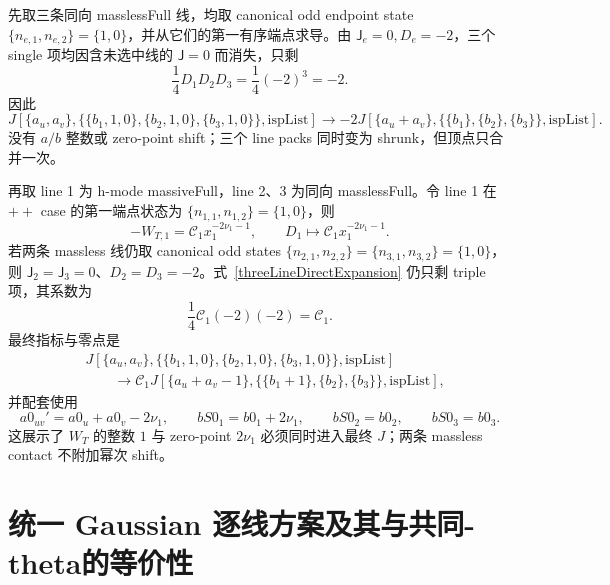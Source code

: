 ﻿\documentclass[a4paper,11pt]{article}
\begin{document}
先取三条同向 masslessFull 线，均取 canonical odd endpoint state $\{n_{e,1},n_{e,2}\}=\{1,0\}$，并从它们的第一有序端点求导。由 $\mathsf J_e=0,D_e=-2$，三个 single 项均因含未选中线的 $\mathsf J=0$ 而消失，只剩
\begin{equation}
 \frac14D_1D_2D_3=\frac14(-2)^3=-2.
\end{equation}
因此
\begin{equation}
 J\!\left[\{a_u,a_v\},
   \{\{b_1,1,0\},\{b_2,1,0\},\{b_3,1,0\}\},\mathrm{ispList}\right]
 \longrightarrow
 -2J\!\left[\{a_u+a_v\},
   \{\{b_1\},\{b_2\},\{b_3\}\},\mathrm{ispList}\right].
 \label{threeMasslessIndexExample}
\end{equation}
没有 $a/b$ 整数或 zero-point shift；三个 line packs 同时变为 shrunk，但顶点只合并一次。

再取 line 1 为 h-mode massiveFull，line 2、3 为同向 masslessFull。令 line 1 在 $++$ case 的第一端点状态为 $\{n_{1,1},n_{1,2}\}=\{1,0\}$，则
\begin{equation}
 -W_{T,1}=\mathcal C_1x_1^{-2\nu_1-1},
 \qquad D_1\longmapsto\mathcal C_1x_1^{-2\nu_1-1}.
\end{equation}
若两条 massless 线仍取 canonical odd states $\{n_{2,1},n_{2,2}\}=\{n_{3,1},n_{3,2}\}=\{1,0\}$，则 $\mathsf J_2=\mathsf J_3=0$、$D_2=D_3=-2$。式~\eqref{threeLineDirectExpansion} 仍只剩 triple 项，其系数为
\begin{equation}
 \frac14\mathcal C_1(-2)(-2)=\mathcal C_1.
\end{equation}
最终指标与零点是
\begin{align}
 &J\!\left[\{a_u,a_v\},
  \{\{b_1,1,0\},\{b_2,1,0\},\{b_3,1,0\}\},\mathrm{ispList}\right]
 \nonumber\\
 &\qquad\longrightarrow
 \mathcal C_1
 J\!\left[\{a_u+a_v-1\},
  \{\{b_1+1\},\{b_2\},\{b_3\}\},\mathrm{ispList}\right],
 \label{mixedThreeLineIndexExample}
\end{align}
并配套使用
\begin{equation}
 a0_{uv}'=a0_u+a0_v-2\nu_1,
 \qquad bS0_1=b0_1+2\nu_1,
 \qquad bS0_2=b0_2,
 \qquad bS0_3=b0_3.
\end{equation}
这展示了 $W_T$ 的整数 $1$ 与 zero-point $2\nu_1$ 必须同时进入最终 $J$；两条 massless contact 不附加幂次 shift。

\section{统一 Gaussian 逐线方案及其与共同-theta的等价性}
\label{app:gaussianDerivation}
\end{document}
